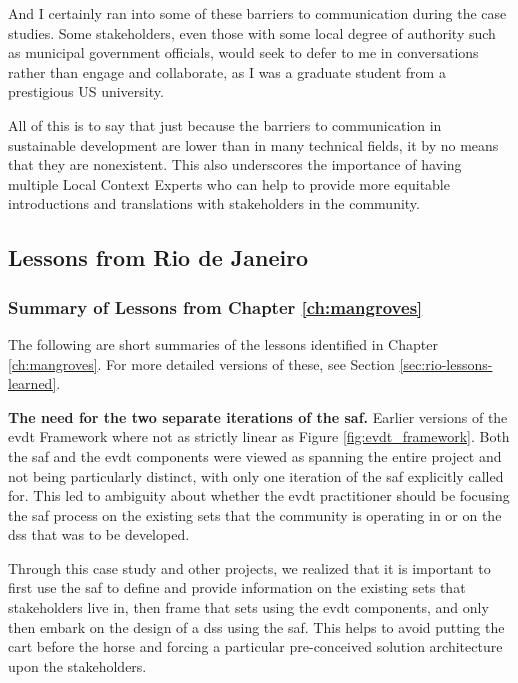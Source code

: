And I certainly ran into some of these barriers to communication during the case studies. Some stakeholders, even those with some local degree of authority such as municipal government officials, would seek to defer to me in conversations rather than engage and collaborate, as I was a graduate student from a prestigious US university. 

All of this is to say that just because the barriers to communication in sustainable development are lower than in many technical fields, it by no means that they are nonexistent. This also underscores the importance of having multiple Local Context Experts who can help to provide more equitable introductions and translations with stakeholders in the community.


\subsection{Lessons from Rio de Janeiro}

\subsubsection{Summary of Lessons from Chapter \ref{ch:mangroves}} 

The following are short summaries of the lessons identified in Chapter \ref{ch:mangroves}. For more detailed versions of these, see Section \ref{sec:rio-lessons-learned}.

\textbf{The need for the two separate iterations of the \ac{saf}.} Earlier versions of the \ac{evdt} Framework where not as strictly linear as Figure \ref{fig:evdt_framework}. Both the \ac{saf} and the \ac{evdt} components were viewed as spanning the entire project and not being particularly distinct, with only one iteration of the \ac{saf} explicitly called for. This led to ambiguity about whether the \ac{evdt} practitioner should be focusing the \ac{saf} process on the existing {sets} that the community is operating in or on the \ac{dss} that was to be developed. 

Through this case study and other projects, we realized that it is important to first use the \ac{saf} to define and provide information on the existing \ac{sets} that stakeholders live in, then frame that \ac{sets} using the \ac{evdt} components, and only then embark on the design of a \ac{dss} using the \ac{saf}. This helps to avoid putting the cart before the horse and forcing a particular pre-conceived solution architecture upon the stakeholders. 


